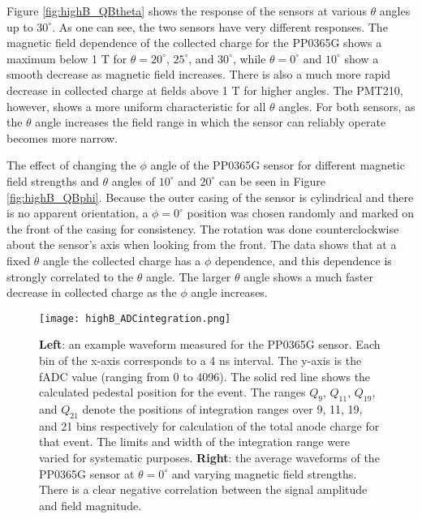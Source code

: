 Figure \ref{fig:highB_QBtheta} shows the response of the sensors at various $\theta$ angles up to $30^{\circ}$. As one can see, the two sensors have very different responses. The magnetic field dependence of the collected charge for the PP0365G shows a maximum below 1 T for $\theta = 20^{\circ}$, $25^{\circ}$, and $30^{\circ}$, while $\theta = 0^{\circ}$ and $10^{\circ}$ show a smooth decrease as magnetic field increases. There is also a much more rapid decrease in collected charge at fields above 1 T for higher angles. The PMT210, however, shows a more uniform characteristic for all $\theta$ angles. For both sensors, as the $\theta$ angle increases the field range in which the sensor can reliably operate becomes more narrow.

The effect of changing the $\phi$ angle of the PP0365G sensor for different magnetic field strengths and $\theta$ angles of $10^{\circ}$ and $20^{\circ}$ can be seen in Figure \ref{fig:highB_QBphi}. Because the outer casing of the sensor is cylindrical and there is no apparent orientation, a $\phi = 0^{\circ}$ position was chosen randomly and marked on the front of the casing for consistency. The rotation was done counterclockwise about the sensor's axis when looking from the front. The data shows that at a fixed $\theta$ angle the collected charge has a $\phi$ dependence, and this dependence is strongly correlated to the $\theta$ angle. The larger $\theta$ angle shows a much faster decrease in collected charge as the $\phi$ angle increases.

\begin{figure}[!htb]
	\centering
	\texttt{[image: highB\_ADCintegration.png]}
	\caption{\textbf{Left}: an example waveform measured for the PP0365G sensor. Each bin of the x-axis corresponds to a 4 ns interval. The y-axis is the fADC value (ranging from 0 to 4096). The solid red line shows the calculated pedestal position for the event. The ranges $Q_9$, $Q_{11}$, $Q_{19}$, and $Q_{21}$ denote the positions of integration ranges over 9, 11, 19, and 21 bins respectively for calculation of the total anode charge for that event. The limits and width of the integration range were varied for systematic purposes. \textbf{Right}: the average waveforms of the PP0365G sensor at $\theta = 0^{\circ}$ and varying magnetic field strengths. There is a clear negative correlation between the signal amplitude and field magnitude.}
	\label{fig:highB_waveform}
\end{figure}

